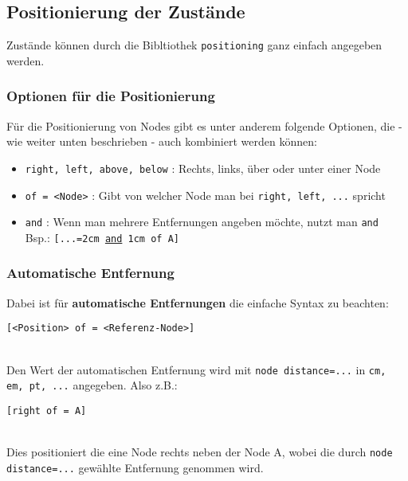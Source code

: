 \documentclass{article}
\begin{document}
	\subsection{Positionierung der Zustände}
		Zustände können durch die Bibltiothek \texttt{positioning} ganz einfach angegeben werden.
		\subsubsection{Optionen für die Positionierung}
		Für die Positionierung von Nodes gibt es unter anderem folgende Optionen, die - wie weiter unten beschrieben - auch kombiniert werden können:\\
		\begin{itemize}
			\item \texttt{right, left, above, below} : Rechts, links, über oder unter einer Node
			\item \texttt{of = <Node>} : Gibt von welcher Node man bei \texttt{right, left, ...} spricht
			\item \texttt{and} : Wenn man mehrere Entfernungen angeben möchte, nutzt man \texttt{and}\\
			Bsp.: \texttt{[...=2cm \underline{and} 1cm of A]}
		\end{itemize}
		\subsubsection{Automatische Entfernung}
		Dabei ist für \textbf{automatische Entfernungen} die einfache Syntax zu beachten:\\
		\begin{minipage}{\linewidth}
			\begin{lstlisting}[caption={Syntax für die Positionierung von Nodes.}]
[<Position> of = <Referenz-Node>]
			\end{lstlisting}
		\end{minipage}\\
		Den Wert der automatischen Entfernung wird mit \texttt{node distance=...} in \texttt{cm, em, pt, ...} angegeben.
		Also z.B.:\\
		\begin{minipage}{\linewidth}
			\begin{lstlisting}[mathescape,caption={Automatische Positionierung einer Node rechts von A.}]
[right of = A]
			\end{lstlisting}
		\end{minipage}\\
		Dies positioniert die eine Node rechts neben der Node A, wobei die durch \texttt{node distance=...} gewählte Entfernung genommen wird.
\end{document}
